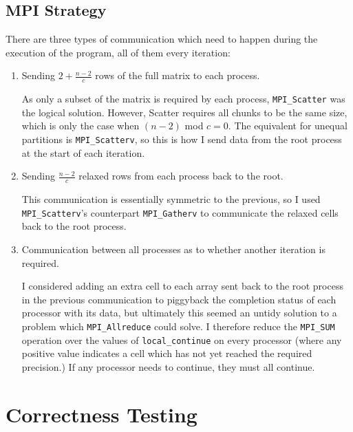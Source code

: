 \documentclass[12pt]{article}
\begin{document}
\subsection{MPI Strategy}

There are three types of communication which need to happen during the execution of the program, all of them every iteration:
\begin{enumerate}
	\item Sending $2+\frac{n-2}{c}$ rows of the full matrix to each process.\par
			As only a subset of the matrix is required by each process, \texttt{MPI\_Scatter} was the logical solution. However, Scatter requires all chunks to be the same size, which is only the case when $(n-2)$ mod $c=0$. The equivalent for unequal partitions is \texttt{MPI\_Scatterv}, so this is how I send data from the root process at the start of each iteration.
	
	\item Sending $\frac{n-2}{c}$ relaxed rows from each process back to the root. \par
			This communication is essentially symmetric to the previous, so I used \texttt{MPI\_Scatterv}'s counterpart \texttt{MPI\_Gatherv} to communicate the relaxed cells back to the root process.
			
	\item Communication between all processes as to whether another iteration is required.\par
			I considered adding an extra cell to each array sent back to the root process in the previous communication to piggyback the completion status of each processor with its data, but ultimately this seemed an untidy solution to a problem which \texttt{MPI\_Allreduce} could solve. I therefore reduce the \texttt{MPI\_SUM} operation over the values of \texttt{local\_continue} on every processor (where any positive value indicates a cell which has not yet reached the required precision.) If any processor needs to continue, they must all continue.
\end{enumerate}


\section{Correctness Testing}
\end{document}

